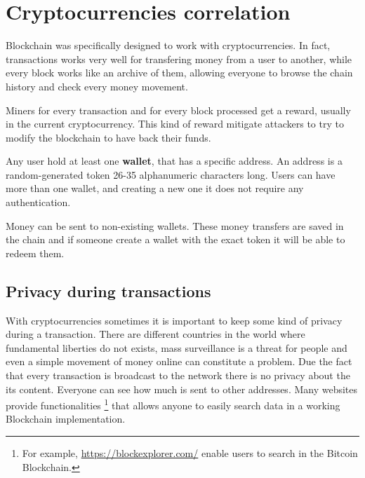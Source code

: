 \section{Cryptocurrencies correlation}
\label{sec:crypto_corr}

Blockchain was specifically designed to work with cryptocurrencies. In fact,
transactions works very well for transfering money from a user to another, while
every block works like an archive of them, allowing everyone to browse
the chain history and check every money movement.

Miners for every transaction and for every block processed get a reward,
usually in the current cryptocurrency. This kind of reward mitigate attackers to
try to modify the blockchain to have back their funds.

Any user hold at least one \textbf{wallet}, that has a specific address. An
address is a random-generated token 26-35 alphanumeric characters long. Users
can have more than one wallet, and creating a new one it does not require any
authentication.

Money can be sent to non-existing wallets. These money transfers are saved in
the chain and if someone create a wallet with the exact token it will be able
to redeem them.

\subsection{Privacy during transactions}



With cryptocurrencies sometimes it is important to keep some kind of privacy
during a transaction. There are different countries in the world where
fundamental liberties do not exists, mass surveillance is a threat for
people and even a simple movement of money online can constitute a problem.
Due the fact that every transaction is broadcast to the network there is no
privacy about the its content. Everyone can see how much is sent to
other addresses. Many websites provide functionalities \footnote{For example,
\url{https://blockexplorer.com/} enable users to search in the Bitcoin
Blockchain.} that allows anyone to easily search data in a working Blockchain
implementation.

